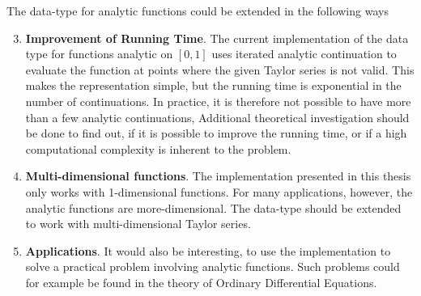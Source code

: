 The data-type for analytic functions could be extended in the following ways
\begin{enumerate}
  \setcounter{enumi}{2}
  \item \textbf{Improvement of Running Time}.
    The current implementation of the data type for functions analytic on
    $[0,1]$ uses iterated analytic continuation to evaluate the function at points where
    the given Taylor series is not valid. 
    This makes the representation simple, but the running time is exponential
    in the number of continuations.
    In practice, it is therefore not possible to have more than a few analytic
    continuations,
    Additional theoretical investigation should be done to find out, if it is
    possible to improve the running time, or if a high computational complexity
    is inherent to the problem.
  \item \textbf{Multi-dimensional functions}.
    The implementation presented in this thesis only works with 1-dimensional
    functions. 
    For many applications, however, the analytic functions are
    more-dimensional.
    The data-type should be extended to work with multi-dimensional Taylor
    series.
  \item \textbf{Applications}.
    It would also be interesting, to use the implementation to solve a
    practical problem involving analytic functions.
    Such problems could for example be found in the theory of Ordinary
    Differential Equations.
\end{enumerate}
